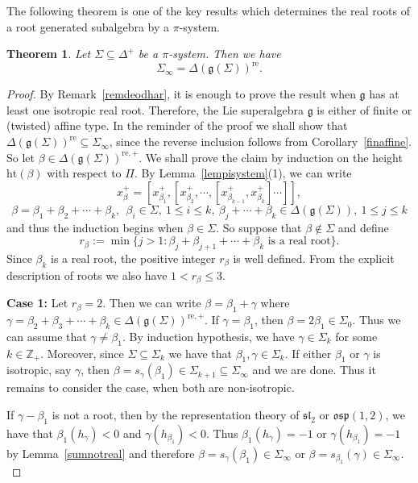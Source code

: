 \documentclass[11pt,reqno]{amsart}
\theoremstyle{plain}
\newtheorem{thm}{Theorem}
\theoremstyle{definition}
\theoremstyle{remark}
\newcommand{\lie}[1]{\mathfrak{#1}}
\newcommand\bz{\mathbb Z}
\numberwithin{equation}{section}
\begin{document}
The following theorem is one of the key results which determines the real roots of a root generated subalgebra by a $\pi$-system.
\begin{thm}\label{proprealroots}
    Let $\Sigma\subseteq \Delta^{+}$ be a $\pi$-system. Then we have $$\Sigma_{\infty}=\Delta(\lie g(\Sigma))^{\mathrm{re}}.$$
\end{thm}
\begin{proof}
    By Remark~\ref{remdeodhar}, it is enough to prove the result when $\lie g$ has at least one isotropic real root. Therefore, the Lie superalgebra $\lie g$ is either of finite or (twisted) affine type. In the reminder of the proof we shall show that $\Delta(\lie g(\Sigma))^{\mathrm{re}}\subseteq \Sigma_\infty$, since the reverse inclusion follows from Corollary~\ref{finaffine}. So let $\beta\in \Delta(\lie g(\Sigma))^{\mathrm{re},+}.$ We shall prove the claim by induction on the height $\mathrm{ht}(\beta)$ with respect to $\Pi$. By Lemma~\ref{lempisystem}(1), we can write
    $$x_\beta^+=[x_{\beta_{1}}^+,[x_{\beta_{2}}^+,\cdots,[x_{\beta_{k-1}}^+,x_{\beta_{k}}^+]\cdots]],$$
    $$\beta=\beta_1+\beta_2+\cdots+\beta_k,\ \ \beta_i\in\Sigma,\ 1\leq i\leq k, \ \beta_j+\cdots+\beta_k\in \Delta(\lie g(\Sigma)),\ 1\leq j\leq k$$
    and thus the induction begins when $\beta\in\Sigma$. So suppose that $\beta\notin \Sigma$ and define $$r_\beta:=\min\{j>1: \beta_{j}+\beta_{j+1}+\cdots+\beta_{k}\text{ is a real root}\}.$$ Since $\beta_{k}$ is a real root, the positive integer $r_\beta$ is well defined. From the explicit description of roots we also have $1<r_{\beta}\leq 3$.
    
\textbf{Case 1:} Let $r_{\beta}=2.$ Then we can write $\beta=\beta_{1}+\gamma$ where $\gamma=\beta_{2}+\beta_{3}+\cdots+\beta_{k}\in \Delta(\lie g(\Sigma))^{\mathrm{re},+}.$ If $\gamma=\beta_{1}$, then $\beta=2\beta_{1}\in \Sigma_0.$ Thus we can assume that $\gamma \neq\beta_{1}.$ By induction hypothesis, we have $\gamma\in \Sigma_k$ for some $k\in \bz_+.$ Moreover, since $\Sigma\subseteq \Sigma_k$ we have that $\beta_{1},\gamma\in \Sigma_k.$ If either $\beta_{1}$ or $\gamma$ is isotropic, say $\gamma$, then $\beta=s_\gamma(\beta_{1})\in\Sigma_{k+1}\subseteq\Sigma_\infty$ and we are done. Thus it remains to consider the case, when both are non-isotropic.

If $\gamma-\beta_{1}$ is not a root, then by the representation theory of $\lie{sl}_2$ or $\lie{osp}(1,2)$, we have that $\beta_{1}(h_\gamma)<0$ and $\gamma(h_{\beta_{1}})<0.$ Thus $\beta_{1}(h_\gamma)=-1$ or $\gamma(h_{\beta_{1}})=-1$ by Lemma~\ref{sumnotreal} and therefore $\beta=s_{\gamma}(\beta_{1})\in \Sigma_\infty$ or $\beta=s_{\beta_{1}}(\gamma)\in \Sigma_\infty.$ 


\end{proof}
\end{document}
